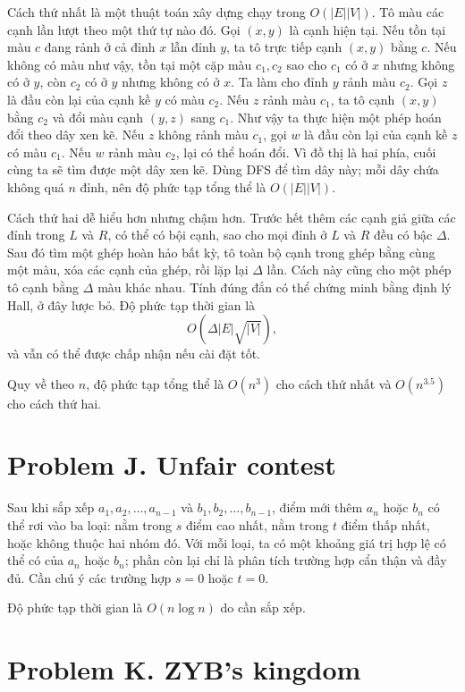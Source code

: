 \documentclass[11pt]{article}
\begin{document}
Cách thứ nhất là một thuật toán xây dựng chạy trong $O(|E||V|)$. Tô màu các
cạnh lần lượt theo một thứ tự nào đó. Gọi $(x,y)$ là cạnh hiện tại. Nếu tồn
tại màu $c$ đang rảnh ở cả đỉnh $x$ lẫn đỉnh $y$, ta tô trực tiếp cạnh
$(x,y)$ bằng $c$. Nếu không có màu như vậy, tồn tại một cặp màu $c_1,c_2$ sao
cho $c_1$ có ở $x$ nhưng không có ở $y$, còn $c_2$ có ở $y$ nhưng không có ở
$x$. Ta làm cho đỉnh $y$ rảnh màu $c_2$. Gọi $z$ là đầu còn lại của cạnh kề
$y$ có màu $c_2$. Nếu $z$ rảnh màu $c_1$, ta tô cạnh $(x,y)$ bằng $c_2$ và
đổi màu cạnh $(y,z)$ sang $c_1$. Như vậy ta thực hiện một phép hoán đổi theo
dây xen kẽ. Nếu $z$ không rảnh màu $c_1$, gọi $w$ là đầu còn lại của cạnh kề
$z$ có màu $c_1$. Nếu $w$ rảnh màu $c_2$, lại có thể hoán đổi. Vì đồ thị là
hai phía, cuối cùng ta sẽ tìm được một dây xen kẽ. Dùng DFS để tìm dây này;
mỗi dây chứa không quá $n$ đỉnh, nên độ phức tạp tổng thể là $O(|E||V|)$.

Cách thứ hai dễ hiểu hơn nhưng chậm hơn. Trước hết thêm các cạnh giả giữa các
đỉnh trong $L$ và $R$, có thể có bội cạnh, sao cho mọi đỉnh ở $L$ và $R$ đều
có bậc $\Delta$. Sau đó tìm một ghép hoàn hảo bất kỳ, tô toàn bộ cạnh trong
ghép bằng cùng một màu, xóa các cạnh của ghép, rồi lặp lại $\Delta$ lần. Cách
này cũng cho một phép tô cạnh bằng $\Delta$ màu khác nhau. Tính đúng đắn có
thể chứng minh bằng định lý Hall, ở đây lược bỏ. Độ phức tạp thời gian là
\[
  O(\Delta |E|\sqrt{|V|}),
\]
và vẫn có thể được chấp nhận nếu cài đặt tốt.

Quy về theo $n$, độ phức tạp tổng thể là $O(n^3)$ cho cách thứ nhất và
$O(n^{3.5})$ cho cách thứ hai.

\section{Problem J. Unfair contest}

Sau khi sắp xếp $a_1,a_2,\ldots,a_{n-1}$ và
$b_1,b_2,\ldots,b_{n-1}$, điểm mới thêm $a_n$ hoặc $b_n$ có thể rơi vào ba
loại: nằm trong $s$ điểm cao nhất, nằm trong $t$ điểm thấp nhất, hoặc không
thuộc hai nhóm đó. Với mỗi loại, ta có một khoảng giá trị hợp lệ có thể có
của $a_n$ hoặc $b_n$; phần còn lại chỉ là phân tích trường hợp cẩn thận và
đầy đủ. Cần chú ý các trường hợp $s=0$ hoặc $t=0$.

Độ phức tạp thời gian là $O(n\log n)$ do cần sắp xếp.

\section{Problem K. ZYB's kingdom}
\end{document}
